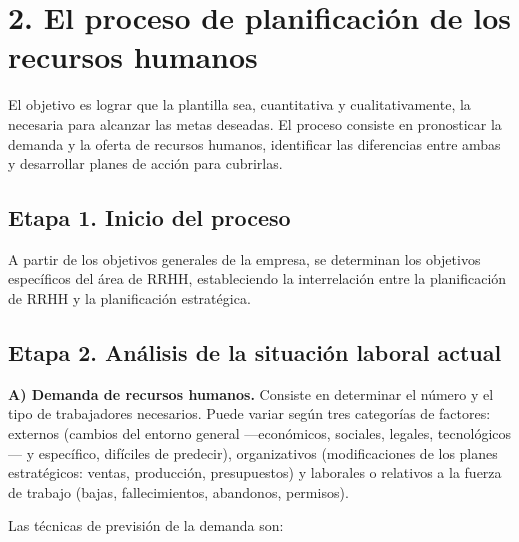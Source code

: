 \documentclass[12pt]{book} %
\begin{document}
\hypertarget{el-proceso-de-planificaciuxf3n-de-los-recursos-humanos}{%
\section{2. El proceso de planificación de los recursos
humanos}\label{el-proceso-de-planificaciuxf3n-de-los-recursos-humanos}}

El objetivo es lograr que la plantilla sea, cuantitativa y
cualitativamente, la necesaria para alcanzar las metas deseadas. El
proceso consiste en pronosticar la demanda y la oferta de recursos
humanos, identificar las diferencias entre ambas y desarrollar planes de
acción para cubrirlas.

\hypertarget{etapa-1.-inicio-del-proceso}{%
\subsection{Etapa 1. Inicio del
proceso}\label{etapa-1.-inicio-del-proceso}}

A partir de los objetivos generales de la empresa, se determinan los
objetivos específicos del área de RRHH, estableciendo la interrelación
entre la planificación de RRHH y la planificación estratégica.

\hypertarget{etapa-2.-anuxe1lisis-de-la-situaciuxf3n-laboral-actual}{%
\subsection{Etapa 2. Análisis de la situación laboral
actual}\label{etapa-2.-anuxe1lisis-de-la-situaciuxf3n-laboral-actual}}

\textbf{A) Demanda de recursos humanos.} Consiste en determinar el
número y el tipo de trabajadores necesarios. Puede variar según tres
categorías de factores: externos (cambios del entorno general
---económicos, sociales, legales, tecnológicos--- y específico,
difíciles de predecir), organizativos (modificaciones de los planes
estratégicos: ventas, producción, presupuestos) y laborales o relativos
a la fuerza de trabajo (bajas, fallecimientos, abandonos, permisos).

Las técnicas de previsión de la demanda son:
\end{document}
